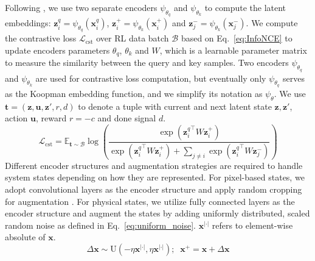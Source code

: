 \documentclass{article}
\begin{document}
Following \cite{he2020momentum,laskin2020curl}, we use two separate encoders $\psi_{\theta_q}$ and $\psi_{\theta_k}$ to compute the latent embeddings: $\mathbf{z}_i^q=\psi_{\theta_q}(\mathbf{x}_i^q)$, $\mathbf{z}_i^+=\psi_{\theta_k}(\mathbf{x}_i^+)$ and $\mathbf{z}_j^-=\psi_{\theta_k}(\mathbf{x}_j^-)$. We compute the contrastive loss $\mathcal{L}_{\text{cst}}$ over RL data batch $\mathcal{B}$ based on Eq.~\eqref{eq:InfoNCE} to update encoders parameters $\theta_q$, $\theta_k$ and $W$, which is a learnable parameter matrix to measure the similarity between the query and key samples. Two encoders $\psi_{\theta_q}$ and $\psi_{\theta_k}$ are used for contrastive loss computation, but eventually only $\psi_{\theta_q}$ serves as the Koopman embedding function, and we simplify its notation as $\psi_{\theta}$. We use $\mathbf{t}=(\mathbf{z}, \mathbf{u}, \mathbf{z}', r, d)$ to denote a tuple with current and 
next latent state $\mathbf{z}, \mathbf{z}'$, action $\mathbf{u}$, reward $r=-c$ and done signal $d$.
\begin{equation}     
\mathcal{L}_{\text{cst}} = \mathbb{E}_{\mathbf{t}\sim \mathcal{B}}\log \left(\frac{\exp({\mathbf{z}_i^q}^{\top}W\mathbf{z}_i^+)}{\exp({\mathbf{z}_i^q}^{\top}W\mathbf{z}_i^+)+\sum_{j\neq i}\exp({\mathbf{z}_i^q}^{\top}W\mathbf{z}_{j}^{-})}\right)
\label{eq:InfoNCE}
\end{equation}
Different encoder structures and augmentation strategies are required to handle system states depending on how they are represented.  For pixel-based states, we adopt convolutional layers as the encoder structure and apply random cropping for augmentation \cite{he2020momentum,laskin2020curl}. For physical states, we utilize fully connected layers as the encoder structure and augment the states by adding uniformly distributed, scaled random noise as defined in Eq.~\eqref{eq:uniform_noise}. $\mathbf{x}^{|\cdot|}$ refers to element-wise absolute of $\mathbf{x}$.
\begin{equation}
    \Delta{\mathbf{x}} \sim \mathrm{U}(-\eta  \mathbf{x}^{|\cdot|}, \eta\mathbf{x}^{|\cdot|}); \;\;
    \mathbf{x}^+ = \mathbf{x} + \Delta{\mathbf{x}}
    \label{eq:uniform_noise}
\end{equation}
\end{document}
